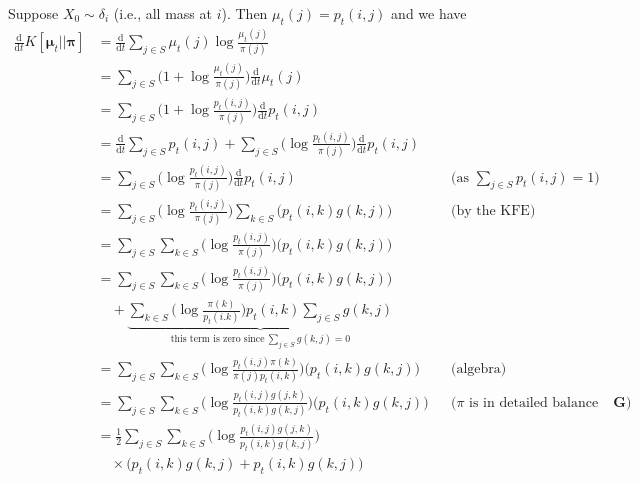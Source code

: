 \documentclass[12pt]{book}
\numberwithin{equation}{chapter}
\theoremstyle{plain}
\numberwithin{theorem}{section}
\theoremstyle{definition}
\numberwithin{exercise}{chapter}
\let\oldendproof\endproof
\renewenvironment{proof}[1][\proofname]{%
  \oldproof[\scshape\underline{#1}]%
}{\oldendproof}
\newcommand{\<}{\langle}
\renewcommand{\>}{\rangle}
\renewcommand{\(}{\left(}
\renewcommand{\)}{\right)}
\renewcommand{\[}{\left[}
\renewcommand{\]}{\right]}
\newcommand\del{\delta}
\newcommand\Gv{\pmb{G}}
\newcommand\muv{\pmb{\mu}}
\newcommand\piv{\pmb{\pi}}
\newcommand\dd{\mathrm{d}}
\begin{document}
\begin{proof}
Suppose $X_0 \sim \del_i$ (i.e., all mass at $i$).  Then $\mu_t(j) = p_t(i,j)$ and we have
\begin{align}
\frac{\dd}{\dd t} K[\muv_t||\piv]
	&=	\frac{\dd}{\dd t} \sum_{j \in S} \mu_t(j) \log \frac{\mu_t(j)}{\pi(j)} \\
	&=	\sum_{j \in S} \Big( 1 + \log \frac{\mu_t(j)}{\pi(j)} \Big) \frac{\dd}{\dd t} \mu_t(j) \\
	&=	\sum_{j \in S} \Big( 1 + \log \frac{p_t(i,j)}{\pi(j)} \Big) \frac{\dd}{\dd t} p_t(i,j) \\
	&=	\frac{\dd}{\dd t} \sum_{j \in S}  p_t(i,j) + \sum_{j \in S} \Big( \log \frac{p_t(i,j)}{\pi(j)} \Big) \frac{\dd}{\dd t} p_t(i,j) \\
	&=	\sum_{j \in S} \Big(  \log \frac{p_t(i,j)}{\pi(j)}\Big)   \frac{\dd}{\dd t} p_t(i,j) &
	&\text{(as $\sum_{j \in S}  p_t(i,j) = 1$)} \\
	&=	\sum_{j \in S} \Big( \log \frac{p_t(i,j)}{\pi(j)} \Big)\sum_{k\in S} \Big( p_t{(i, k)}g(k, j) \Big)  &
	&\text{(by the KFE)} \\ 
	&= \sum_{j \in S}\sum_{k\in S}  \Big( \log \frac{p_t(i,j)}{\pi(j)} \Big) \Big( p_t{(i, k)}g(k, j)
		\Big)   \\ 
	&= \sum_{j \in S} \sum_{k\in S}  \Big( \log \frac{p_t(i,j)}{\pi(j)} \Big) \Big( p_t{(i, k)}g(k, j)
		\Big)  \\ & \quad +  \underbrace{ \sum_{k\in S}  \Big( \log \frac{\pi(k)}{p_t(i.k)} \Big)p_t{(i, k)} \sum_{j \in S}g(k, j) }_{\text{this term is zero since} \  \sum_{j \in S}g(k, j) = 0 } \\	
		&= \sum_{j \in S}\sum_{k\in S}  \Big( \log \frac{p_t(i,j) \pi(k) }{ \pi(j) p_t(i, k)} \Big) \Big( p_t{(i, k)}g(k, j) \Big)  &
	& \text{(algebra)} \\ 
	 &= \sum_{j \in S} \sum_{k \in S} \Big(  \log \frac{p_t(i,j)g(j,k) }{ p_t(i,k) g(k,j)} \Big) \Big( p_t{(i, k)}g(k, j)\Big) &
	&\text{($\pi$ is in detailed balance with $\Gv$)} \\
	  &= \frac{1}{2}\sum_{j \in S} \sum_{k \in S} \Big(  \log \frac{p_t(i,j)g(j,k) }{ p_t(i,k) g(k,j)} \Big) \\ & \quad
				\times \Big( p_t{(i, k)}g(k, j)+ p_t{(i, k)}g(k, j)\Big) \\

\end{align}
\end{proof}
\end{document}
